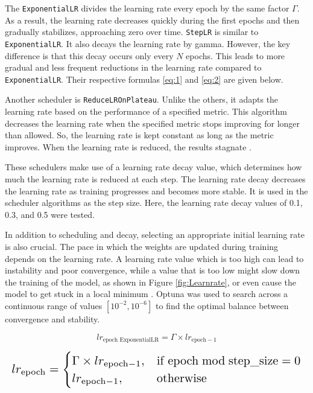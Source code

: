 \documentclass[twocolumn]{article}
\begin{document}
The \texttt{ExponentialLR} divides the learning rate every epoch by the same factor $\Gamma$.  
As a result, the learning rate decreases quickly during the first epochs and then gradually stabilizes, approaching zero over time.  
\texttt{StepLR} is similar to \texttt{ExponentialLR}. It also decays the learning rate by gamma. However, the key difference is that this decay occurs only every $N$ epochs.  
This leads to more gradual and less frequent reductions in the learning rate compared to \texttt{ExponentialLR}.  
Their respective formulas \ref{eq:1} and \ref{eq:2} are given below.

Another scheduler is \texttt{ReduceLROnPlateau}. Unlike the others, it adapts the learning rate based on the performance of a specified metric.  
This algorithm decreases the learning rate when the specified metric stops improving for longer than allowed.  
So, the learning rate is kept constant as long as the metric improves.  
When the learning rate is reduced, the results stagnate \cite{unknown-author-no-date3} \cite{isbhargav-2020}.

These schedulers make use of a learning rate decay value, which determines how much the learning rate is reduced at each step.  
The learning rate decay decreases the learning rate as training progresses and becomes more stable.  
It is used in the scheduler algorithms as the step size.  
Here, the learning rate decay values of 0.1, 0.3, and 0.5 were tested.

In addition to scheduling and decay, selecting an appropriate initial learning rate is also crucial.  
The pace in which the weights are updated during training depends on the learning rate.  
A learning rate value which is too high can lead to instability and poor convergence, while a value that is too low might slow down the training of the model, as shown in Figure \ref{fig:Learnrate}, or even cause the model to get stuck in a local minimum \cite{jordan_2018_setting}.  
Optuna was used to search across a continuous range of values \([10^{-2}, 10^{-6}]\) to find the optimal balance between convergence and stability.

\begin{equation}\label{eq:1}
lr_{\text{epoch ExponentialLR}} = \Gamma \times lr_{\text{epoch}-1}
\end{equation}

\begin{equation}\label{eq:2}
\resizebox{1.\hsize}{!}{$
lr_{\text{epoch}} =
\begin{cases}
\Gamma \times lr_{\text{epoch}-1}, & \text{if } \text{epoch} \bmod \text{step\_size} = 0 \\
lr_{\text{epoch}-1}, & \text{otherwise}
\end{cases}
$}
\end{equation}
\end{document}
